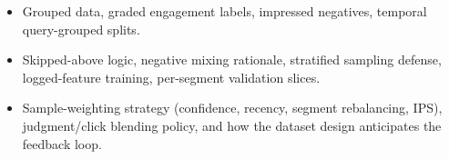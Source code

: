 \begin{interviewq}

\goodgreat
\begin{itemize}
    \item {} Grouped data, graded engagement labels, impressed negatives, temporal query-grouped splits.
    \item {} Skipped-above logic, negative mixing rationale, stratified sampling defense, logged-feature training, per-segment validation slices.
    \item {} Sample-weighting strategy (confidence, recency, segment rebalancing, IPS), judgment/click blending policy, and how the dataset design anticipates the feedback loop.
\end{itemize}

\end{interviewq}


